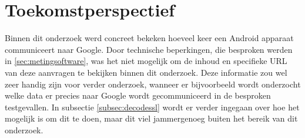 \section{Toekomstperspectief}
Binnen dit onderzoek werd concreet bekeken hoeveel keer een Android apparaat communiceert naar Google. Door technische beperkingen, die besproken werden in \ref{sec:metingsoftware}, was het niet mogelijk om de inhoud en specifieke URL van deze aanvragen te bekijken binnen dit onderzoek. Deze informatie zou wel zeer handig zijn voor verder onderzoek, wanneer er bijvoorbeeld wordt onderzocht welke data er precies naar Google wordt gecommuniceerd in de besproken testgevallen. In subsectie \ref{subsec:decodessl} wordt er verder ingegaan over hoe het mogelijk is om dit te doen, maar dit viel jammergenoeg buiten het bereik van dit onderzoek.